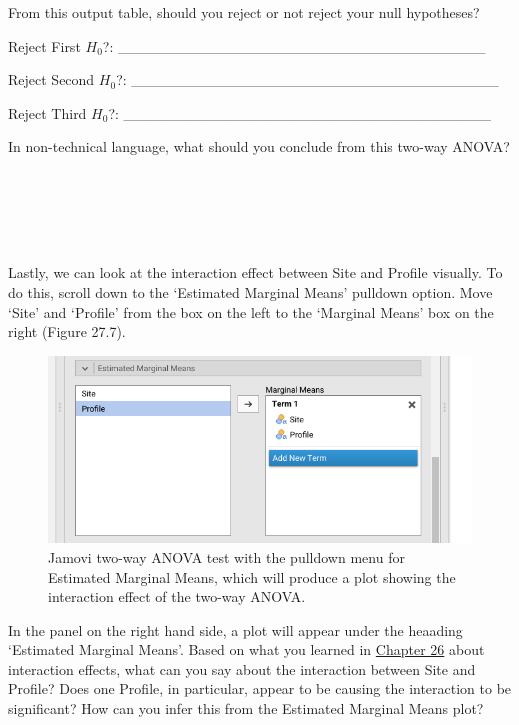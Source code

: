 \documentclass[
]{scrbook}
\begin{document}
From this output table, should you reject or not reject your null hypotheses?

Reject First \(H_{0}\)?: \_\_\_\_\_\_\_\_\_\_\_\_\_\_\_\_\_\_\_\_\_\_\_\_\_\_\_\_\_\_\_\_\_\_\_

Reject Second \(H_{0}\)?: \_\_\_\_\_\_\_\_\_\_\_\_\_\_\_\_\_\_\_\_\_\_\_\_\_\_\_\_\_\_\_\_\_\_\_

Reject Third \(H_{0}\)?: \_\_\_\_\_\_\_\_\_\_\_\_\_\_\_\_\_\_\_\_\_\_\_\_\_\_\_\_\_\_\_\_\_\_\_

In non-technical language, what should you conclude from this two-way ANOVA?

\begin{verbatim}





\end{verbatim}

Lastly, we can look at the interaction effect between Site and Profile visually.
To do this, scroll down to the `Estimated Marginal Means' pulldown option.
Move `Site' and `Profile' from the box on the left to the `Marginal Means' box on the right (Figure 27.7).

\begin{figure}
\includegraphics[width=1\linewidth]{img/jamovi_marginal_means} \caption{Jamovi two-way ANOVA test with the pulldown menu for Estimated Marginal Means, which will produce a plot showing the interaction effect of the two-way ANOVA.}\label{fig:unnamed-chunk-133}
\end{figure}

In the panel on the right hand side, a plot will appear under the heaading `Estimated Marginal Means'.
Based on what you learned in \protect\hyperlink{Chapter_26}{Chapter 26} about interaction effects, what can you say about the interaction between Site and Profile?
Does one Profile, in particular, appear to be causing the interaction to be significant?
How can you infer this from the Estimated Marginal Means plot?
\end{document}
